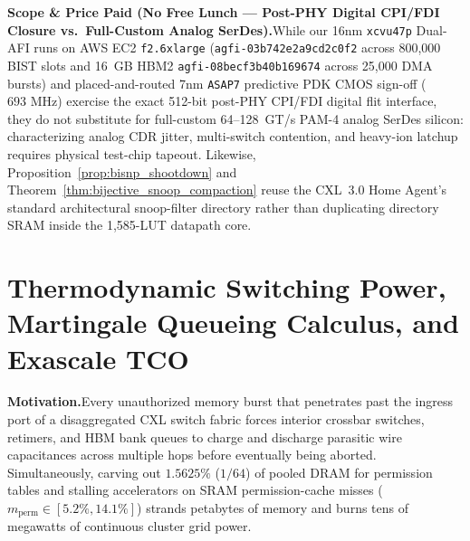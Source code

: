 \documentclass[11pt,letterpaper]{article}
\providecommand{\CoreClbLuts}{1,585}
\providecommand{\AwsAgfiId}{agfi-03b742e2a9cd2c0f2}
\providecommand{\AwsHbmAgfiId}{agfi-08becf3b40b169674}
\providecommand{\AwsLiveBursts}{25,000}
\providecommand{\AwsBistSlots}{800,000}
\providecommand{\AsicFmaxMhz}{\ensuremath{693\text{~MHz}}}
\providecommand{\CorePhysicalLUTs}{\CoreClbLuts}
\theoremstyle{spectralthm}
\begin{document}
\noindent\textbf{Scope \& Price Paid (No Free Lunch --- Post-PHY Digital CPI/FDI Closure vs.\ Full-Custom Analog SerDes).}\;While our 16nm \texttt{xcvu47p} Dual-AFI runs on AWS EC2 \texttt{f2.6xlarge} (\texttt{\AwsAgfiId} across \AwsBistSlots{} BIST slots and 16~GB HBM2 \texttt{\AwsHbmAgfiId} across \AwsLiveBursts{} DMA bursts) and placed-and-routed 7nm \texttt{ASAP7} predictive PDK CMOS sign-off (\AsicFmaxMhz) exercise the exact 512-bit post-PHY CPI/FDI digital flit interface, they do not substitute for full-custom 64--128~GT/s PAM-4 analog SerDes silicon: characterizing analog CDR jitter, multi-switch contention, and heavy-ion latchup requires physical test-chip tapeout. Likewise, Proposition~\ref{prop:bisnp_shootdown} and Theorem~\ref{thm:bijective_snoop_compaction} reuse the CXL~3.0 Home Agent's standard architectural snoop-filter directory rather than duplicating directory SRAM inside the \CorePhysicalLUTs-LUT datapath core.

\section{Thermodynamic Switching Power, Martingale Queueing Calculus, and Exascale TCO}
\label{sec:power}

\noindent\textbf{Motivation.}\;Every unauthorized memory burst that penetrates past the ingress port of a disaggregated CXL switch fabric forces interior crossbar switches, retimers, and HBM bank queues to charge and discharge parasitic wire capacitances across multiple hops before eventually being aborted. Simultaneously, carving out $1.5625\%$ ($1/64$) of pooled DRAM for permission tables and stalling accelerators on SRAM permission-cache misses ($m_{\mathrm{perm}} \in [5.2\%, 14.1\%]$) strands petabytes of memory and burns tens of megawatts of continuous cluster grid power.\par\smallskip
\end{document}
